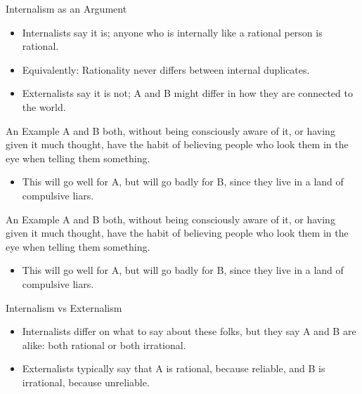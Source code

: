 \documentclass[
  17pt,
  letterpaper,
  ignorenonframetext,
  aspectratio=169,
]{beamer}
\providecommand{\tightlist}{%
  \setlength{\itemsep}{0pt}\setlength{\parskip}{0pt}}\usepackage{longtable,booktabs,array}
\begin{document}
\begin{frame}{Internalism as an Argument}
\protect\hypertarget{internalism-as-an-argument-1}{}
\begin{itemize}[<+->]
\tightlist
\item
  Internalists say it is; anyone who is internally like a rational
  person is rational.
\item
  Equivalently: Rationality never differs between internal duplicates.
\item
  Externalists say it is not; A and B might differ in how they are
  connected to the world.
\end{itemize}
\end{frame}

\begin{frame}{An Example}
\protect\hypertarget{an-example}{}
A and B both, without being consciously aware of it, or having given it
much thought, have the habit of believing people who look them in the
eye when telling them something.

\begin{itemize}[<+->]
\tightlist
\item
  This will go well for A, but will go badly for B, since they live in a
  land of compulsive liars.
\end{itemize}
\end{frame}

\begin{frame}{An Example}
\protect\hypertarget{an-example-1}{}
A and B both, without being consciously aware of it, or having given it
much thought, have the habit of believing people who look them in the
eye when telling them something.

\begin{itemize}[<+->]
\tightlist
\item
  This will go well for A, but will go badly for B, since they live in a
  land of compulsive liars.
\end{itemize}
\end{frame}

\begin{frame}{Internalism vs Externalism}
\protect\hypertarget{internalism-vs-externalism}{}
\begin{itemize}[<+->]
\tightlist
\item
  Internalists differ on what to say about these folks, but they say A
  and B are alike: both rational or both irrational.
\item
  Externalists typically say that A is rational, because reliable, and B
  is irrational, because unreliable.
\end{itemize}
\end{frame}
\end{document}
